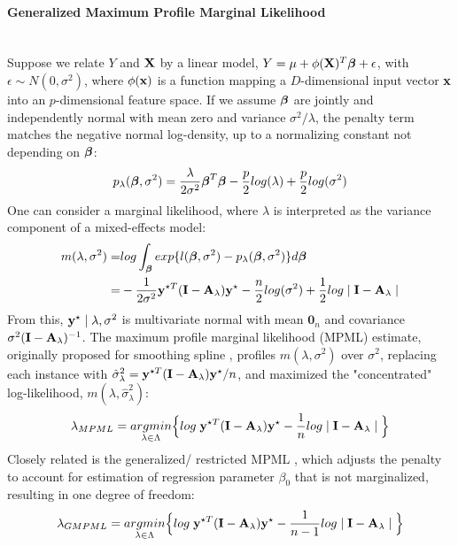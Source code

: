 \documentclass[11pt]{article}
\begin{document}
\paragraph{Generalized Maximum Profile Marginal Likelihood}\mbox{}\\
Suppose we relate $Y$ and ${\bf X}$ by a linear model, $Y=\mu+\phi({\bf X})^T\boldsymbol{\beta}+\epsilon$, with $\epsilon \sim N(0, \sigma^2)$, where $\phi({\bf x})$ is a function mapping a $D$-dimensional input vector ${\bf x}$ into an $p$-dimensional feature space. If we assume $\boldsymbol{\beta}$ are jointly and independently normal with mean zero and variance $\sigma^2/\lambda$, the penalty term matches the negative normal log-density, up to a normalizing constant not depending on $\boldsymbol{\beta}$:
\begin{align*}
p_\lambda(\boldsymbol{\beta}, \sigma^2)=\frac{\lambda}{2\sigma^2}\boldsymbol{\beta}^T\boldsymbol{\beta}-\frac{p}{2}log(\lambda)+\frac{p}{2}log(\sigma^2)
\end{align*}
One can consider a marginal likelihood, where $\lambda$ is interpreted as the variance component of a mixed-effects model:
\begin{align*}
m(\lambda, \sigma^2)=&log \int_{\boldsymbol{\beta}} exp\{ l(\boldsymbol{\beta}, \sigma^2)-p_\lambda(\boldsymbol{\beta}, \sigma^2)\}d\boldsymbol{\beta} \\=&-\frac{1}{2\sigma^2}{\bf y}^{\star T}({\bf I}-{\bf A}_\lambda){\bf y}^\star-\frac{n}{2}log(\sigma^2)+\frac{1}{2}log \mid {\bf I}-{\bf A}_\lambda \mid
\end{align*}
From this, ${\bf y}^\star \mid\lambda, \sigma^2$ is multivariate normal with mean $\mathbf{0}_n$ and covariance $\sigma^2({\bf I}-{\bf A}_\lambda)^{-1}$. The maximum profile marginal likelihood (MPML) estimate, originally proposed for smoothing spline \citep{wecker_signal_1983}, profiles $m(\lambda, \sigma^2)$ over $\sigma^2$, replacing each instance with $\hat{\sigma}_\lambda^2={\bf y}^{\star T}({\bf I}-{\bf A}_\lambda){\bf y}^\star/n$, and maximized the "concentrated" log-likelihood, $m(\lambda, \hat{\sigma}_\lambda^2)$:
\begin{align*}
\lambda_{MPML}=\underset{\lambda \in \Lambda}{argmin}\Big\{log\; {\bf y}^{\star T}({\bf I}-{\bf A}_\lambda){\bf y}^\star-\frac{1}{n}log \mid {\bf I}-{\bf A}_\lambda \mid \Big\}
\end{align*}
Closely related is the generalized/ restricted MPML \citep{harville_maximum_1977, wahba_comparison_1985}, which adjusts the penalty to account for estimation of regression parameter $\beta_0$ that is not marginalized, resulting in one degree of freedom:
\begin{align}
\lambda_{GMPML}=\underset{\lambda \in \Lambda}{argmin}\Big\{log\; {\bf y}^{\star T}({\bf I}-{\bf A}_\lambda){\bf y}^\star-\frac{1}{n-1}log \mid {\bf I}-{\bf A}_\lambda \mid \Big\} \label{5}
\end{align}
\end{document}
